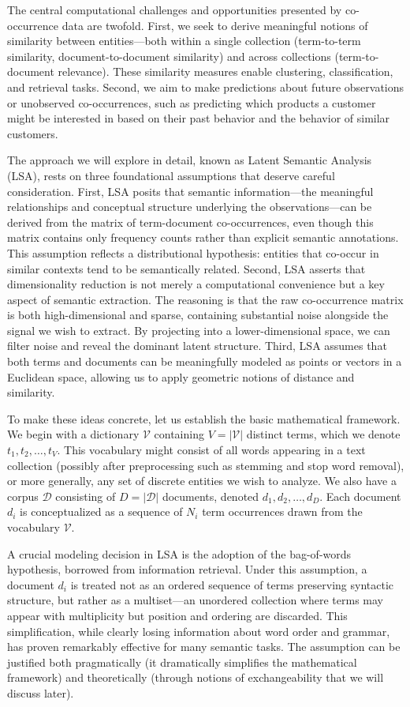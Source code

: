 The central computational challenges and opportunities presented by co-occurrence data are twofold. First, we seek to derive meaningful notions of similarity between entities—both within a single collection (term-to-term similarity, document-to-document similarity) and across collections (term-to-document relevance). These similarity measures enable clustering, classification, and retrieval tasks. Second, we aim to make predictions about future observations or unobserved co-occurrences, such as predicting which products a customer might be interested in based on their past behavior and the behavior of similar customers.

The approach we will explore in detail, known as Latent Semantic Analysis (LSA), rests on three foundational assumptions that deserve careful consideration. First, LSA posits that semantic information—the meaningful relationships and conceptual structure underlying the observations—can be derived from the matrix of term-document co-occurrences, even though this matrix contains only frequency counts rather than explicit semantic annotations. This assumption reflects a distributional hypothesis: entities that co-occur in similar contexts tend to be semantically related. Second, LSA asserts that dimensionality reduction is not merely a computational convenience but a key aspect of semantic extraction. The reasoning is that the raw co-occurrence matrix is both high-dimensional and sparse, containing substantial noise alongside the signal we wish to extract. By projecting into a lower-dimensional space, we can filter noise and reveal the dominant latent structure. Third, LSA assumes that both terms and documents can be meaningfully modeled as points or vectors in a Euclidean space, allowing us to apply geometric notions of distance and similarity.

To make these ideas concrete, let us establish the basic mathematical framework. We begin with a dictionary $\mathcal{V}$ containing $V = |\mathcal{V}|$ distinct terms, which we denote $t_1, t_2, \ldots, t_V$. This vocabulary might consist of all words appearing in a text collection (possibly after preprocessing such as stemming and stop word removal), or more generally, any set of discrete entities we wish to analyze. We also have a corpus $\mathcal{D}$ consisting of $D = |\mathcal{D}|$ documents, denoted $d_1, d_2, \ldots, d_D$. Each document $d_i$ is conceptualized as a sequence of $N_i$ term occurrences drawn from the vocabulary $\mathcal{V}$.

A crucial modeling decision in LSA is the adoption of the bag-of-words hypothesis, borrowed from information retrieval. Under this assumption, a document $d_i$ is treated not as an ordered sequence of terms preserving syntactic structure, but rather as a multiset—an unordered collection where terms may appear with multiplicity but position and ordering are discarded. This simplification, while clearly losing information about word order and grammar, has proven remarkably effective for many semantic tasks. The assumption can be justified both pragmatically (it dramatically simplifies the mathematical framework) and theoretically (through notions of exchangeability that we will discuss later).

